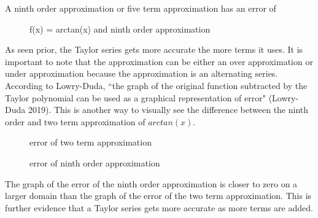 \documentclass[12pt, titlepage]{article}
\begin{document}
A ninth order approximation or five term approximation has an error of 
\begin{figure}[H]
\centering
    \caption[]{f(x) = arctan(x) and ninth order approximation}
\end{figure}

As seen prior, the Taylor series gets more accurate the more terms it uses. It is important to note that the approximation can be either an over approximation or under approximation because the approximation is an alternating series. According to Lowry-Duda, ``the graph of the original function subtracted by the Taylor polynomial can be used as a graphical representation of error" (Lowry-Duda 2019). This is another way to visually see the difference between the ninth order and two term approximation of \(arctan(x)\). 

\begin{figure}[H]
\centering
    \caption[]{error of two term approximation}
\end{figure}

\begin{figure}[H]
\centering
    \caption[]{error of ninth order approximation}
\end{figure}

The graph of the error of the ninth order approximation is closer to zero on a larger domain than the graph of the error of the two term approximation. This is further evidence that a Taylor series gets more accurate as more terms are added.
\end{document}

